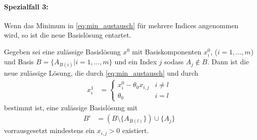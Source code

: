 \paragraph*{Spezialfall 3:} Wenn das Minimum in \eqref{eq:min_austausch} für mehrere Indices angenommen wird, so ist die neue Basislösung entartet.

\begin{theorem}
Gegeben sei eine zulässige Basislösung $x^0$ mit Basiskomponenten $x_i^0$, ($i=1,\dotsc,m$) und Basis $B=\{A_{B(i)} | i=1,\dotsc,m\}$ und ein Index $j$ sodass $A_j \notin B$. Dann ist die neue zulässige Lösung, die durch \eqref{eq:min_austausch} und durch
\begin{align}
x_i^1 &= \begin{cases}
x_i^0 - \theta_0 x_{i,j} & i \neq l\\
\theta_0 & i = l\end{cases}
\end{align}
bestimmt ist, eine zulässige Basislösung mit
\begin{align*}
B' &= (B \setminus \{A_{B(l)}\} ) \cup \{A_j\}
\end{align*} vorrausgesetzt mindestens ein $x_{i,j} > 0$ existiert.
\end{theorem}
